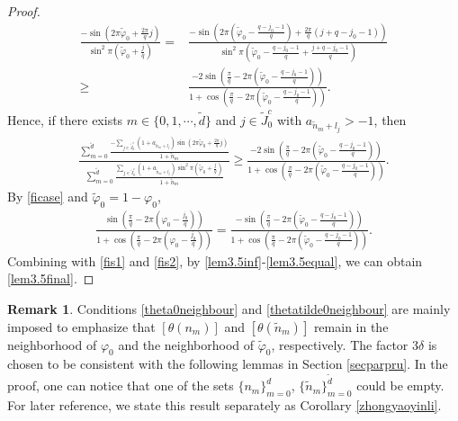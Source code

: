 \documentclass[12pt]{amsart}
\theoremstyle{plain}
\theoremstyle{definition}
\newtheorem{remark}[theorem]{Remark}
\begin{document}
\begin{proof}
\begin{align}
	\frac{-\sin\left(2\pi\tilde{\varphi}_0+\frac{2\pi}{q}j\right)}{\sin^2\pi\left(\tilde{\varphi}_0+\frac{j}{q}\right)}=&	\frac{-\sin\left(2\pi\left(\tilde{\varphi}_0-\frac{q-j_0-1}{q}\right)+\frac{2\pi}{q}(j+q-j_0-1)\right)}{\sin^2\pi\left(\tilde{\varphi}_0-\frac{q-j_0-1}{q}+\frac{j+q-j_0-1}{q}\right)}\nonumber\\
	\geq& \frac{-2\sin\left(\frac{\pi}{q}-2\pi\left(\tilde{\varphi}_0-\frac{q-j_0-1}{q}\right)\right)}{1+\cos\left(\frac{\pi}{q}-2\pi\left(\tilde{\varphi}_0-\frac{q-j_0-1}{q}\right)\right)}.\nonumber
\end{align}
Hence, if there exists $m\in \{0,1,\cdots,\tilde{d}\}$ and $j\in \tilde{J}_0^c$ with $a_{\tilde{n}_m+l_j}>-1$, then
\begin{align}
	\frac{\sum_{m=0}^{\tilde{d}}\frac{-\sum_{j\in \tilde{J}_0^c}(1+a_{\tilde{n}_m+l_j})\sin\left(2\pi\tilde{\varphi}_0+\frac{2\pi}{q}j\right)}{1+\tilde{n}_{m}}}{\sum_{m=0}^{\tilde{d}}\frac{\sum_{j\in \tilde{J}_0^c}(1+a_{\tilde{n}_m+l_j})\sin^2\pi\left(\tilde{\varphi}_0+\frac{j}{q}\right)}{1+\tilde{n}_m}}\geq \frac{-2\sin\left(\frac{\pi}{q}-2\pi\left(\tilde{\varphi}_0-\frac{q-j_0-1}{q}\right)\right)}{1+\cos\left(\frac{\pi}{q}-2\pi\left(\tilde{\varphi}_0-\frac{q-j_0-1}{q}\right)\right)}.\label{lem3.5halfless}
\end{align}
By \eqref{ficase} and $\tilde{\varphi}_0=1-\varphi_0$,
\begin{align}
	\frac{\sin\left(\frac{\pi}{q}-2\pi\left(\varphi_0-\frac{j_0}{q}\right)\right)}{1+\cos\left(\frac{\pi}{q}-2\pi\left(\varphi_0-\frac{j_0}{q}\right)\right)}=\frac{-\sin\left(\frac{\pi}{q}-2\pi\left(\tilde{\varphi}_0-\frac{q-j_0-1}{q}\right)\right)}{1+\cos\left(\frac{\pi}{q}-2\pi\left(\tilde{\varphi}_0-\frac{q-j_0-1}{q}\right)\right)}.\label{lem3.5equal}
\end{align}
Combining with \eqref{fis1}  and \eqref{fis2}, by \eqref{lem3.5inf}-\eqref{lem3.5equal}, we can obtain \eqref{lem3.5final}.	\end{proof}
	
	\begin{remark}Conditions \eqref{theta0neighbour} and \eqref{thetatilde0neighbour}
	are mainly imposed to emphasize that $[\theta(n_m)]$ and $[\theta(\tilde{n}_m)]$ remain in the neighborhood of $\varphi_0$ and the neighborhood of $\tilde{\varphi}_0$, respectively. The factor $3\delta$ is chosen to be consistent with the following lemmas in Section \ref{secparpru}.
	In the proof, one can notice that one of the sets $\{n_{m}\}_{m=0}^{d}$, $\{\tilde{n}_{m}\}_{m=0}^{\tilde{d}}$ could be empty. For later reference, we state this result separately as Corollary \ref{zhongyaoyinli}.
\end{remark}
	
\end{document}
